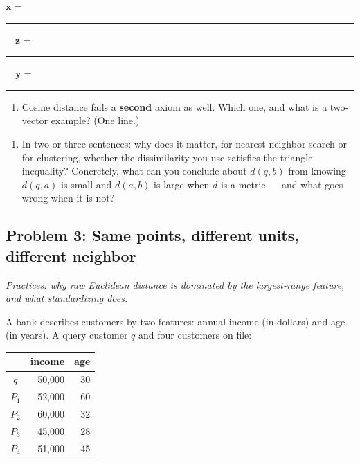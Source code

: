 \documentclass[
  11pt,
]{article}
\newcounter{none} %
\providecommand{\tightlist}{%
  \setlength{\itemsep}{0pt}\setlength{\parskip}{0pt}}
\newcommand{\answerspace}[1]{\par\vspace*{#1}}  %
\newcommand{\blank}[1][1.2in]{\rule{#1}{0.4pt}}
\newcommand{\answerpage}{\clearpage}
\begin{document}
\(\mathbf{x} =\) \blank[0.9in] \(\quad \mathbf{z} =\)
\blank[0.9in] \(\quad \mathbf{y} =\) \blank[0.9in]

\answerspace{2.3in}

\begin{enumerate}
\def\labelenumi{(\alph{enumi})}
\setcounter{enumi}{2}
\tightlist
\item
  Cosine distance fails a \textbf{second} axiom as well. Which one, and
  what is a two-vector example? (One line.)
\end{enumerate}

\answerspace{1in}

\begin{enumerate}
\def\labelenumi{(\alph{enumi})}
\setcounter{enumi}{3}
\tightlist
\item
  In two or three sentences: why does it matter, for nearest-neighbor
  search or for clustering, whether the dissimilarity you use satisfies
  the triangle inequality? Concretely, what can you conclude about
  \(d(q,b)\) from knowing \(d(q,a)\) is small and \(d(a,b)\) is large
  when \(d\) is a metric --- and what goes wrong when it is not?
\end{enumerate}

\answerspace{1.8in}

\answerpage

\subsection{Problem 3: Same points, different units, different
neighbor}\label{problem-3-same-points-different-units-different-neighbor}

\emph{Practices: why raw Euclidean distance is dominated by the
largest-range feature, and what standardizing does.}

A bank describes customers by two features: annual income (in dollars)
and age (in years). A query customer \(q\) and four customers on file:

{\def\LTcaptype{none} %
\begin{longtable}[]{@{}crr@{}}
\toprule\noalign{}
& income & age \\
\midrule\noalign{}
\endhead
\bottomrule\noalign{}
\endlastfoot
\(q\) & 50,000 & 30 \\
\(P_1\) & 52,000 & 60 \\
\(P_2\) & 60,000 & 32 \\
\(P_3\) & 45,000 & 28 \\
\(P_4\) & 51,000 & 45 \\
\end{longtable}
}
\end{document}
